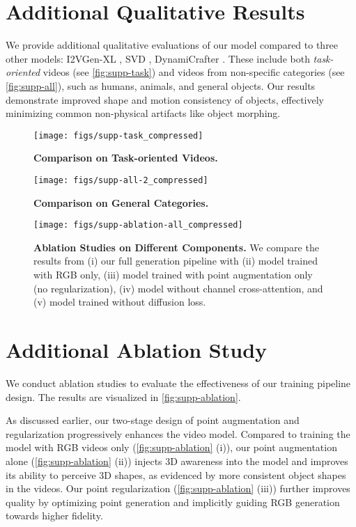 \begin{appendix}
\section{Additional Qualitative Results}
\label{sec:supp:comparison}
We provide additional qualitative evaluations of our model compared to three other models: I2VGen-XL \cite{zhang2023i2vgen}, SVD \cite{blattmann2023stablevideodiffusionscaling}, DynamiCrafter \cite{xing2025dynamicrafter}. These include both \textit{task-oriented} videos (see \autoref{fig:supp-task}) and videos from non-specific categories (see \autoref{fig:supp-all}), such as humans, animals, and general objects. Our results demonstrate improved shape and motion consistency of objects, effectively minimizing common non-physical artifacts like object morphing.

\begin{figure*}
\texttt{[image: figs/supp-task\_compressed]}
\caption{\textbf{Comparison on Task-oriented Videos.} 
 }\label{fig:supp-task}
\end{figure*}

\begin{figure*}
\texttt{[image: figs/supp-all-2\_compressed]}
\caption{\textbf{Comparison on General Categories.} 
 }\label{fig:supp-all}
\end{figure*}

\begin{figure*}
\texttt{[image: figs/supp-ablation-all\_compressed]}
\caption{\textbf{Ablation Studies on Different Components.} We compare the results from (i) our full generation pipeline with (ii) model trained with RGB only, (iii) model trained with point augmentation only (no regularization), (iv) model without channel cross-attention, and (v) model trained without diffusion loss.}\label{fig:supp-ablation}
\end{figure*}

\newpage
\section{Additional Ablation Study}


\label{sec:supp:ablation}
We conduct ablation studies to evaluate the effectiveness of our training pipeline design. The results are visualized in \autoref{fig:supp-ablation}.

As discussed earlier, our two-stage design of point augmentation and regularization progressively enhances the video model. Compared to training the model with RGB videos only (\autoref{fig:supp-ablation} (i)), our point augmentation alone (\autoref{fig:supp-ablation} (ii)) injects 3D awareness into the model and improves its ability to perceive 3D shapes, as evidenced by more consistent object shapes in the videos. Our point regularization (\autoref{fig:supp-ablation} (iii)) further improves quality by optimizing point generation and implicitly guiding RGB generation towards higher fidelity.


\end{appendix}
